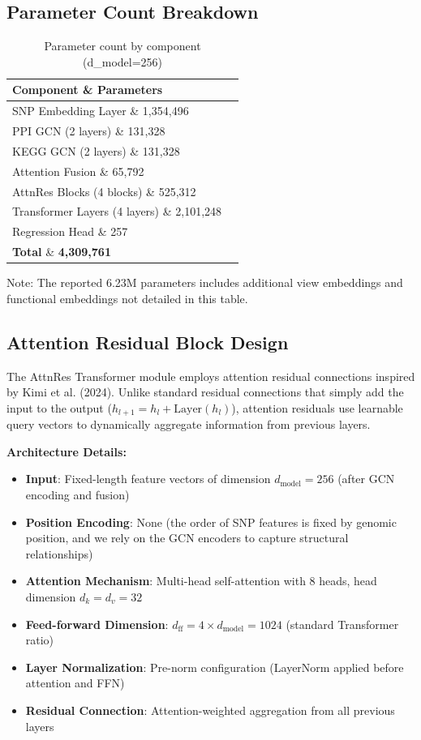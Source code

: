 \documentclass[11pt,a4paper]{article}
\begin{document}
\subsection{Parameter Count Breakdown}
\label{subsec:param_count}

\begin{table}[H]
\centering
\caption{Parameter count by component (d\_model=256)}
\label{tab:param_count}
\begin{tabular}{lr}
\toprule
\textbf{Component} \& \textbf{Parameters} \\
\midrule
SNP Embedding Layer \& 1,354,496 \\
PPI GCN (2 layers) \& 131,328 \\
KEGG GCN (2 layers) \& 131,328 \\
Attention Fusion \& 65,792 \\
AttnRes Blocks (4 blocks) \& 525,312 \\
Transformer Layers (4 layers) \& 2,101,248 \\
Regression Head \& 257 \\
\midrule
\textbf{Total} \& \textbf{4,309,761} \\
\bottomrule
\end{tabular}
\end{table}

Note: The reported 6.23M parameters includes additional view embeddings and functional embeddings not detailed in this table.

\subsection{Attention Residual Block Design}
\label{subsec:attnres_design}

The AttnRes Transformer module employs attention residual connections inspired by Kimi et al. (2024). Unlike standard residual connections that simply add the input to the output ($h_{l+1} = h_l + \text{Layer}(h_l)$), attention residuals use learnable query vectors to dynamically aggregate information from previous layers.

\textbf{Architecture Details:}
\begin{itemize}
    \item \textbf{Input}: Fixed-length feature vectors of dimension $d_{\text{model}} = 256$ (after GCN encoding and fusion)
    \item \textbf{Position Encoding}: None (the order of SNP features is fixed by genomic position, and we rely on the GCN encoders to capture structural relationships)
    \item \textbf{Attention Mechanism}: Multi-head self-attention with 8 heads, head dimension $d_k = d_v = 32$
    \item \textbf{Feed-forward Dimension}: $d_{\text{ff}} = 4 \times d_{\text{model}} = 1024$ (standard Transformer ratio)
    \item \textbf{Layer Normalization}: Pre-norm configuration (LayerNorm applied before attention and FFN)
    \item \textbf{Residual Connection}: Attention-weighted aggregation from all previous layers
\end{itemize}
\end{document}
